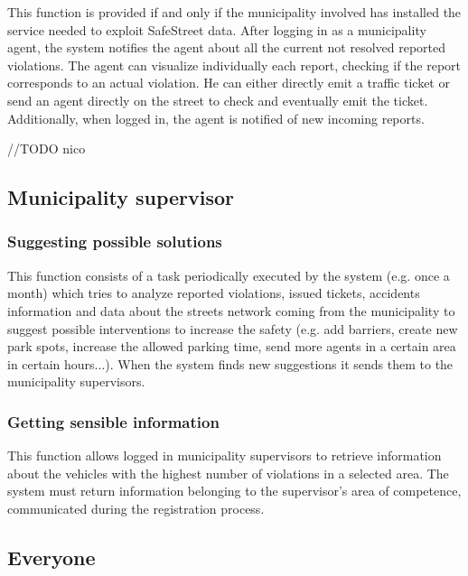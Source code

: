 \documentclass[a4paper]{report}
\begin{document}
This function is provided if and only if the municipality involved has installed the service needed to exploit SafeStreet data. After logging in as a municipality agent, the system notifies the agent about all the current not resolved reported violations. The agent can visualize individually each report, checking if the report corresponds to an actual violation. He can  either directly emit a traffic ticket or send an agent directly on the street to check and eventually emit the ticket.
Additionally, when logged in, the agent is notified of new incoming reports.

//TODO nico 


\subsection{Municipality supervisor}

\subsubsection{Suggesting possible solutions} 
This function consists of a task periodically executed by the system (e.g. once a month) which tries to analyze reported violations, issued tickets, accidents information and data about the streets network coming from the municipality to suggest possible interventions to increase the safety (e.g. add barriers, create new park spots, increase the allowed parking time, send more agents in a certain area in certain hours...). When the system finds new suggestions it sends them to the municipality supervisors.

\subsubsection{Getting sensible information}
This function allows logged in municipality supervisors to retrieve information about the vehicles with the highest number of violations in a selected area. The system must return information belonging to the supervisor's area of competence, communicated during the registration process.

\subsection{Everyone} 
\end{document}

